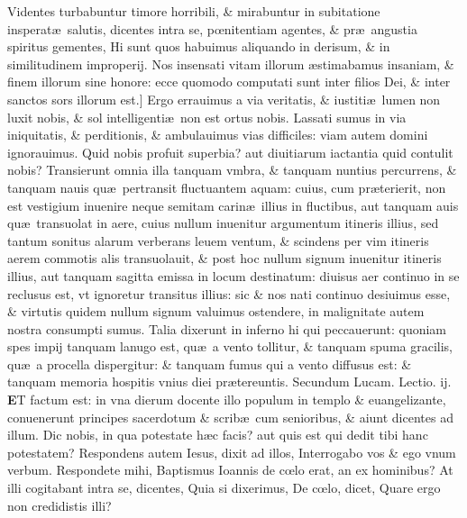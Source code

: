 \documentclass[a5paper,10pt]{book}
\def\leftmarginnote{%
	\lrmarginnote{\hskip -\marginparsep \hskip -6.5em}}
\def\rightmarginnote{%
	\lrmarginnote{\hskip\columnwidth \hskip -1em}}
\def\ae{æ}
\def\oe{œ}
\begin{document}
\begin{multicols*}{2}
Videntes turbabuntur timore horribili, \& mirabuntur in subitatione insperat\ae \ salutis, dicentes intra se, p\oe nitentiam agentes, \& pr\ae \ angustia spiritus gementes, Hi sunt quos habuimus aliquando in derisum, \& in similitudinem improperij.
Nos insensati vitam illorum \ae stimabamus insaniam, \& finem illorum sine honore: ecce quomodo computati sunt inter filios Dei, \& inter sanctos sors
illorum est.]
Ergo\rightmarginnote{B} errauimus a via veritatis, \& iustiti\ae \ lumen non luxit nobis, \& sol intelligenti\ae \ non est ortus nobis.
Lassati sumus in via iniquitatis, \& perditionis, \& ambulauimus vias difficiles: viam autem domini ignorauimus.
Quid nobis profuit superbia? aut diuitiarum iactantia quid contulit nobis?
Transierunt omnia illa tanquam vmbra, \& tanquam nuntius percurrens, \& tanquam nauis qu\ae \ pertransit fluctuantem aquam: cuius, cum pr\ae terierit, non est vestigium inuenire neque semitam carin\ae \ illius in fluctibus, aut tanquam auis qu\ae \ transuolat in aere, cuius nullum inuenitur argumentum itineris illius, sed tantum sonitus alarum verberans leuem ventum, \& scindens per vim itineris aerem commotis alis transuolauit, \& post hoc nullum signum inuenitur itineris illius, aut tanquam sagitta emissa in locum destinatum: diuisus aer continuo in se reclusus est, vt ignoretur transitus illius: sic \& nos nati continuo desiuimus esse, \& virtutis quidem nullum signum valuimus ostendere, in malignitate autem nostra consumpti sumus.
Talia dixerunt in inferno hi qui peccauerunt: quoniam spes impij tanquam lanugo est, qu\ae \ a vento tollitur, \& tanquam spuma gracilis, qu\ae \ a procella dispergitur: \& tanquam fumus qui a vento diffusus est: \& tanquam memoria hospitis vnius diei pr\ae tereuntis.
\fancyhead[C]{\color{red} Feria. iiij. Dominic\ae . iij. post aduentum}
\newline \color{red} Secundum Lucam. \hfill Lectio. ij. \color{black}
\vspace{-.25em}
\lettrine[lines=2]{\bfseries \color{red} E}{}T\leftmarginnote{\begin{flushright}c. 20.\end{flushright}} factum est: in vna dierum docente illo populum in templo \& euangelizante, conuenerunt principes sacerdotum \& scrib\ae \ cum senioribus, \& aiunt dicentes ad illum.
Dic nobis, in qua potestate h\ae c facis? aut quis est qui dedit tibi hanc potestatem?
Respondens autem Iesus, dixit ad illos, Interrogabo vos \& ego vnum verbum. Respondete mihi, Baptismus Ioannis de c\oe lo erat, an ex hominibus?
At illi cogitabant intra se, dicentes, Quia si dixerimus, De c\oe lo, dicet, Quare ergo non credidistis illi?

\end{multicols*}
\end{document}
